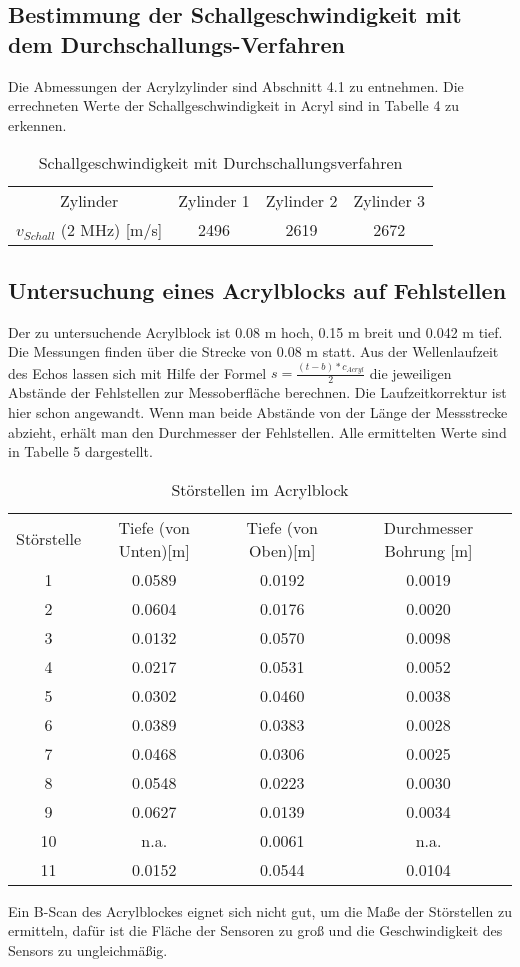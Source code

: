 \documentclass[11pt,ngerman,a4paper]{article}
\begin{document}
\subsection{Bestimmung der Schallgeschwindigkeit mit dem Durchschallungs-Verfahren}

Die Abmessungen der Acrylzylinder sind Abschnitt 4.1 zu entnehmen. Die errechneten Werte der Schallgeschwindigkeit in Acryl sind in Tabelle 4 zu erkennen.
\begin{table}[h]
\centering
 \begin{tabular}{|c||c|c|c|}
 Zylinder & Zylinder 1 & Zylinder 2 & Zylinder 3 \\
 $v_{Schall}$ (2 MHz) [m/s] & 2496 & 2619 & 2672 \\
 \end{tabular}
\caption{Schallgeschwindigkeit mit Durchschallungsverfahren}
\end{table}
\subsection{Untersuchung eines Acrylblocks auf Fehlstellen}
Der zu untersuchende Acrylblock ist 0.08 m hoch, 0.15 m breit und 0.042 m tief. Die Messungen finden über die Strecke von 0.08 m statt. Aus der Wellenlaufzeit des Echos lassen sich mit Hilfe der Formel $s=\frac{(t-b)*c_{Acryl}}{2}$ die jeweiligen Abstände der Fehlstellen zur Messoberfläche berechnen. Die Laufzeitkorrektur ist hier schon angewandt. Wenn man beide Abstände von der Länge der Messstrecke abzieht, erhält man den Durchmesser der Fehlstellen.  Alle ermittelten Werte sind in Tabelle 5 dargestellt.
\begin{table}[h]
\centering
 \begin{tabular}{|c||c|c|c|}
Störstelle  & Tiefe (von Unten)[m] & Tiefe (von Oben)[m]& Durchmesser Bohrung [m] \\
1 & 0.0589 & 0.0192 & 0.0019 \\
2 & 0.0604 & 0.0176 & 0.0020 \\
3 & 0.0132 & 0.0570 & 0.0098 \\
4 & 0.0217 & 0.0531 & 0.0052 \\
5 & 0.0302 & 0.0460 & 0.0038 \\
6 & 0.0389 & 0.0383 & 0.0028 \\
7 & 0.0468 & 0.0306 & 0.0025 \\
8 & 0.0548 & 0.0223 & 0.0030 \\
9 & 0.0627 & 0.0139 & 0.0034 \\
10 & n.a. & 0.0061 & n.a. \\
11 & 0.0152 & 0.0544 & 0.0104 \\
 \end{tabular}
\caption{Störstellen im Acrylblock}
\end{table}
Ein B-Scan des Acrylblockes eignet sich nicht gut, um die Maße der Störstellen zu ermitteln, dafür ist die Fläche der Sensoren zu groß und die Geschwindigkeit des Sensors zu ungleichmäßig.
\end{document}
